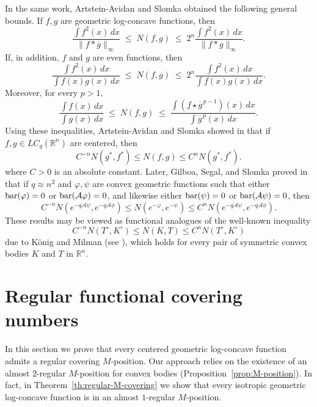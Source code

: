 \documentclass[11pt,leqno]{article}
\theoremstyle{definition}
\theoremstyle{remark}
\numberwithin{equation}{section}
\newcommand{\ls}{\leqslant}
\begin{document}
In the same work, Artstein-Avidan and Slomka obtained the following general bounds. If   
$f,g$ are geometric log-concave functions, then
$$\frac{\int f^{2}(x)\,dx}{\|f\ast \overline{g}\|_{\infty}}
\;\ls\;N(f,g)\;\ls\;2^{n}\frac{\int f^{2}(x)\,dx}{\|f\ast g\|_{\infty}}.$$
If, in addition, $f$ and $g$ are even functions, then
$$\frac{\int f^{2}(x)\,dx}{\int f(x)g(x)\,dx}\;\ls\;N(f,g)\;\ls\;
2^{n}\frac{\int f^{2}(x)\,dx}{\int f(x)g(x)\,dx}.$$
Moreover, for every $p>1$,
$$\frac{\int f(x)\,dx}{\int g(x)\,dx}\;\ls\;N(f,g)\;\ls\;
\frac{\int (f\star \overline{g}^{\,p-1})(x)\,dx}{\int \overline{g}^{\,p}(x)\,dx}.$$
Using these inequalities, Artstein-Avidan and Slomka showed in \cite{Artstein-Slomka-2021} 
that if $f,g\in LC_g(\mathbb{R}^n)$ are centered, then
$$C^{-n}N(g^{\ast},f^{\ast})\ls N(f,g)\ls C^nN(g^{\ast},f^{\ast}).$$
where $C>0$ is an absolute constant.  
Later, Gilboa, Segal, and Slomka proved in \cite{Gilboa-Segal-Slomka-2025} that if 
$q\approx n^2$ and $\varphi,\psi$ are convex geometric functions such that either 
${\rm bar}(\varphi)=0$ or ${\rm bar}(\mathcal{A}\varphi)=0$, and likewise either 
${\rm bar}(\psi)=0$ or ${\rm bar}(\mathcal{A}\psi)=0$, then
$$C^{-n}N(e^{-q\mathcal{A}\psi},e^{-q\mathcal{A}\phi})\ls N(e^{-\varphi},e^{-\psi})\ls C^nN(e^{-q\mathcal{A}\psi},e^{-q\mathcal{A}\phi}).$$
These results may be viewed as functional analogues of the well-known inequality
$$C^{-n}N(T^{\circ},K^{\circ})\ls N(K,T)\ls C^nN(T^{\circ},K^{\circ})$$
due to K\"{o}nig and Milman (see \cite[Theorem~8.2.3]{AGA-book}), which holds for every pair 
of symmetric convex bodies $K$ and $T$ in $\mathbb{R}^n$.

\section{Regular functional covering numbers}\label{section:3}

In this section we prove that every centered geometric log-concave function admits a regular
covering $M$-position. Our approach relies on the existence of an almost $2$-regular $M$-position
for convex bodies (Proposition~\ref{prop:M-position}). In fact, in Theorem~\ref{th:regular-M-covering}
we show that every isotropic geometric log-concave function is in an almost $1$-regular $M$-position.
\end{document}
